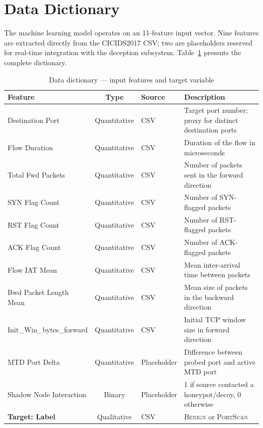 \documentclass[12pt,a4paper]{report}
\begin{document}
\section{Data Dictionary}\label{sec:data_dictionary}

The machine learning model operates on an 11-feature input vector. Nine features are extracted directly from the CICIDS2017 CSV; two are placeholders reserved for real-time integration with the deception subsystem. Table~\ref{tab:data_dict} presents the complete dictionary.

\begin{table}[H]
\centering
\caption{Data dictionary --- input features and target variable}
\label{tab:data_dict}
\begin{tabularx}{\textwidth}{lclX}
\toprule
\textbf{Feature} & \textbf{Type} & \textbf{Source} & \textbf{Description} \\
\midrule
Destination Port & Quantitative & CSV & Target port number; proxy for distinct destination ports \\
Flow Duration & Quantitative & CSV & Duration of the flow in microseconds \\
Total Fwd Packets & Quantitative & CSV & Number of packets sent in the forward direction \\
SYN Flag Count & Quantitative & CSV & Number of SYN-flagged packets \\
RST Flag Count & Quantitative & CSV & Number of RST-flagged packets \\
ACK Flag Count & Quantitative & CSV & Number of ACK-flagged packets \\
Flow IAT Mean & Quantitative & CSV & Mean inter-arrival time between packets \\
Bwd Packet Length Mean & Quantitative & CSV & Mean size of packets in the backward direction \\
Init\_Win\_bytes\_forward & Quantitative & CSV & Initial TCP window size in forward direction \\
MTD Port Delta & Quantitative & Placeholder & Difference between probed port and active MTD port \\
Shadow Node Interaction & Binary & Placeholder & 1 if source contacted a honeypot/decoy, 0 otherwise \\
\midrule
\textbf{Target: Label} & Qualitative & CSV & \textsc{Benign} or \textsc{PortScan} \\
\bottomrule
\end{tabularx}
\end{table}
\end{document}

